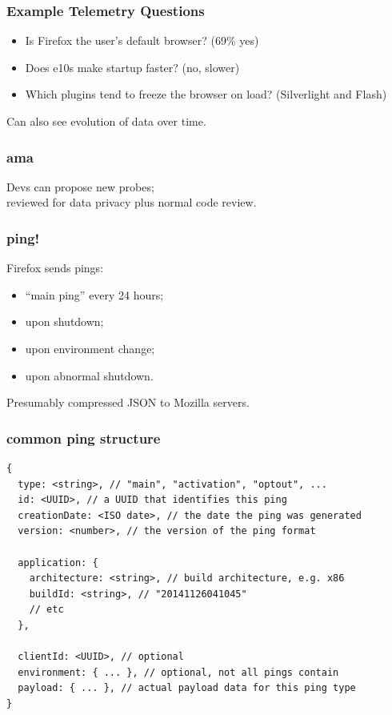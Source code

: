 \begin{frame}
\frametitle{Example Telemetry Questions}
\Large
\begin{itemize}
\item Is Firefox the user's default browser? (69\% yes)
\item Does e10s make startup faster? (no, slower)
\item Which plugins tend to freeze the browser on load? (Silverlight and Flash)
\end{itemize}
Can also see evolution of data over time.
\end{frame}

\begin{frame}
\frametitle{ama}
\Large

Devs can propose new probes;\\
reviewed for data privacy plus normal code review.
\end{frame}

\begin{frame}
\frametitle{ping!}

\Large
Firefox sends pings:
\begin{itemize}
\item ``main ping'' every 24 hours;
\item upon shutdown;
\item upon environment change;
\item upon abnormal shutdown.
\end{itemize}
Presumably compressed JSON to Mozilla servers.

\end{frame}

\begin{frame}[fragile]
\frametitle{common ping structure}
\begin{verbatim}
{
  type: <string>, // "main", "activation", "optout", ...
  id: <UUID>, // a UUID that identifies this ping
  creationDate: <ISO date>, // the date the ping was generated
  version: <number>, // the version of the ping format

  application: {
    architecture: <string>, // build architecture, e.g. x86
    buildId: <string>, // "20141126041045"
    // etc
  },

  clientId: <UUID>, // optional
  environment: { ... }, // optional, not all pings contain
  payload: { ... }, // actual payload data for this ping type
}
\end{verbatim}
\end{frame}

